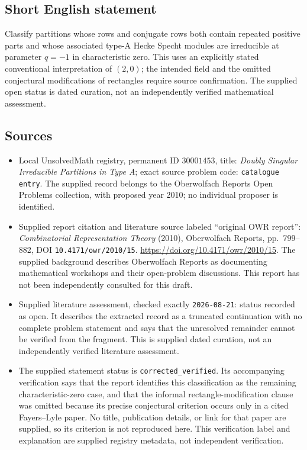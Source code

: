 \documentclass[11pt]{article}
\begin{document}
\subsection{Short English statement}
Classify partitions whose rows and conjugate rows both contain repeated positive parts and whose associated type-A Hecke Specht modules are irreducible at parameter \(q=-1\) in characteristic zero. This uses an explicitly stated conventional interpretation of \((2,0)\); the intended field and the omitted conjectural modifications of rectangles require source confirmation. The supplied open status is dated curation, not an independently verified mathematical assessment.
\subsection{Sources}
\begin{itemize}
\item Local UnsolvedMath registry, permanent ID \(30001453\), title: \emph{Doubly Singular Irreducible Partitions in Type A}; exact source problem code: \texttt{catalogue entry}. The supplied record belongs to the Oberwolfach Reports Open Problems collection, with proposed year 2010; no individual proposer is identified.
\item Supplied report citation and literature source labeled ``original OWR report'': \emph{Combinatorial Representation Theory} (2010), Oberwolfach Reports, pp.\ 799--882, DOI \texttt{10.4171/owr/2010/15}. \url{https://doi.org/10.4171/owr/2010/15}. The supplied background describes Oberwolfach Reports as documenting mathematical workshops and their open-problem discussions. This report has not been independently consulted for this draft.
\item Supplied literature assessment, checked exactly \texttt{2026-08-21}: status recorded as open. It describes the extracted record as a truncated continuation with no complete problem statement and says that the unresolved remainder cannot be verified from the fragment. This is supplied dated curation, not an independently verified literature assessment.
\item The supplied statement status is \texttt{corrected\_verified}. Its accompanying verification says that the report identifies this classification as the remaining characteristic-zero case, and that the informal rectangle-modification clause was omitted because its precise conjectural criterion occurs only in a cited Fayers--Lyle paper. No title, publication details, or link for that paper are supplied, so its criterion is not reproduced here. This verification label and explanation are supplied registry metadata, not independent verification.
\end{itemize}
\end{document}
